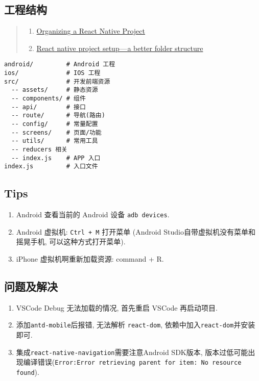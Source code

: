 \subsection{工程结构}\label{ux5de5ux7a0bux7ed3ux6784}

\begin{quote}
\begin{enumerate}
\def\labelenumi{\arabic{enumi}.}
\tightlist
\item
  \href{https://medium.com/the-react-native-log/organizing-a-react-native-project-9514dfadaa0}{Organizing
  a React Native Project}
\item
  \href{https://hackernoon.com/manage-react-native-project-folder-structure-and-simplify-the-code-c98da77ef792}{React
  native project setup --- a better folder structure}
\end{enumerate}
\end{quote}

\begin{lstlisting}
android/         # Android 工程
ios/             # IOS 工程
src/             # 开发前端资源
  -- assets/     # 静态资源
  -- components/ # 组件
  -- api/        # 接口
  -- route/      # 导航(路由)
  -- config/     # 常量配置
  -- screens/    # 页面/功能
  -- utils/      # 常用工具
  -- reducers 相关
  -- index.js    # APP 入口
index.js         # 入口文件
\end{lstlisting}

\subsection{Tips}\label{tips}

\begin{enumerate}
\def\labelenumi{\arabic{enumi}.}
\tightlist
\item
  Android 查看当前的 Android 设备 \lstinline!adb devices!.
\item
  Android 虚拟机: \lstinline!Ctrl + M! 打开菜单 (Android
  Studio自带虚拟机没有菜单和摇晃手机, 可以这种方式打开菜单).
\item
  iPhone 虚拟机啊重新加载资源: command + R.
\end{enumerate}

\subsection{问题及解决}\label{ux95eeux9898ux53caux89e3ux51b3}

\begin{enumerate}
\def\labelenumi{\arabic{enumi}.}
\tightlist
\item
  VSCode Debug 无法加载的情况, 首先重启 VSCode 再启动项目.
\item
  添加\lstinline!antd-mobile!后报错, 无法解析 \lstinline!react-dom!,
  依赖中加入\lstinline!react-dom!并安装即可.
\item
  集成\lstinline!react-native-navigation!需要注意Android SDK版本,
  版本过低可能出现编译错误(\lstinline!Error:Error retrieving parent for item: No resource found!).
\end{enumerate}

